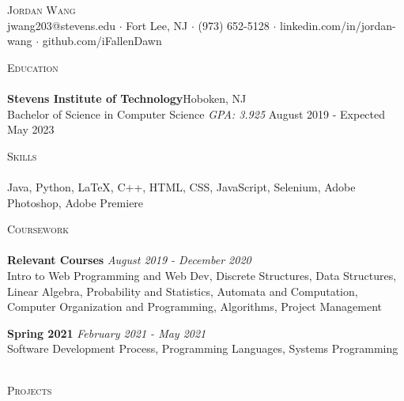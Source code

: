 \documentclass[10pt]{article}
\newcommand{\lineunder} {
    \vspace*{-8pt} \\
    \hspace*{-18pt} \hrulefill \\
}
\newcommand{\header} [1] {
    {\hspace*{-18pt}\vspace*{6pt} \textsc{#1}}
    \vspace*{-6pt} \lineunder
}
\begin{document}
\vspace*{-40pt}

    

\vspace*{2pt}
\begin{center}
	{\Huge \scshape {Jordan Wang}}\\
	jwang203@stevens.edu $\cdot$ Fort Lee, NJ $\cdot$ (973) 652-5128 $\cdot$ linkedin.com/in/jordan-wang $\cdot$ github.com/iFallenDawn \\
\end{center}

\header{Education}
\textbf{Stevens Institute of Technology}\hfill Hoboken, NJ\\
Bachelor of Science in Computer Science \textit{GPA: 3.925} \hfill August 2019 - Expected May 2023\\
\vspace{2mm}

\header{Skills}
	Java, Python, \LaTeX, C++, HTML, CSS, JavaScript, Selenium, Adobe Photoshop, Adobe Premiere                    \\
\vspace{2mm}

\header{Coursework}
{\textbf{Relevant Courses}} {\sl August 2019 - December 2020} \hfill 
\\
Intro to Web Programming and Web Dev, Discrete Structures, Data Structures, Linear Algebra, Probability and Statistics, Automata and Computation, Computer Organization and Programming, Algorithms, Project Management\\
\vspace*{2mm}

{\textbf{Spring 2021}} {\sl February 2021 - May 2021} \hfill 
\\
Software Development Process, Programming Languages, Systems Programming\\
\vspace*{2mm}
\ 

\header{Projects}
\end{document}
